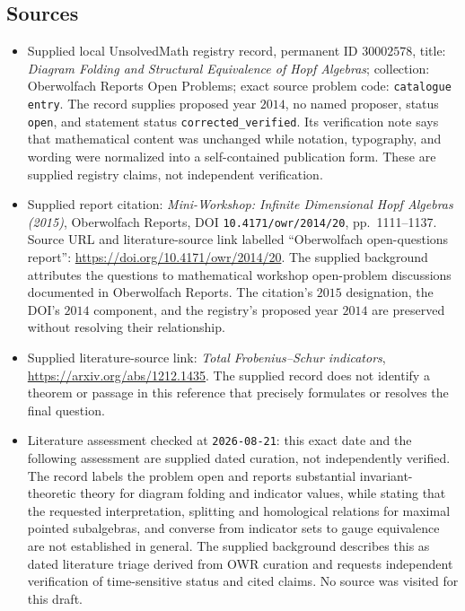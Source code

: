 \documentclass[11pt]{article}
\begin{document}
\subsection{Sources}
\begin{itemize}
\item Supplied local UnsolvedMath registry record, permanent ID \(30002578\), title: \emph{Diagram Folding and Structural Equivalence of Hopf Algebras}; collection: Oberwolfach Reports Open Problems; exact source problem code: \texttt{catalogue entry}. The record supplies proposed year \(2014\), no named proposer, status \texttt{open}, and statement status \texttt{corrected\_verified}. Its verification note says that mathematical content was unchanged while notation, typography, and wording were normalized into a self-contained publication form. These are supplied registry claims, not independent verification.
\item Supplied report citation: \emph{Mini-Workshop: Infinite Dimensional Hopf Algebras (2015)}, Oberwolfach Reports, DOI \texttt{10.4171/owr/2014/20}, pp.\ 1111--1137. Source URL and literature-source link labelled ``Oberwolfach open-questions report'': \url{https://doi.org/10.4171/owr/2014/20}. The supplied background attributes the questions to mathematical workshop open-problem discussions documented in Oberwolfach Reports. The citation's \(2015\) designation, the DOI's \(2014\) component, and the registry's proposed year \(2014\) are preserved without resolving their relationship.
\item Supplied literature-source link: \emph{Total Frobenius--Schur indicators}, \url{https://arxiv.org/abs/1212.1435}. The supplied record does not identify a theorem or passage in this reference that precisely formulates or resolves the final question.
\item Literature assessment checked at \texttt{2026-08-21}: this exact date and the following assessment are supplied dated curation, not independently verified. The record labels the problem open and reports substantial invariant-theoretic theory for diagram folding and indicator values, while stating that the requested interpretation, splitting and homological relations for maximal pointed subalgebras, and converse from indicator sets to gauge equivalence are not established in general. The supplied background describes this as dated literature triage derived from OWR curation and requests independent verification of time-sensitive status and cited claims. No source was visited for this draft.
\end{itemize}
\end{document}
